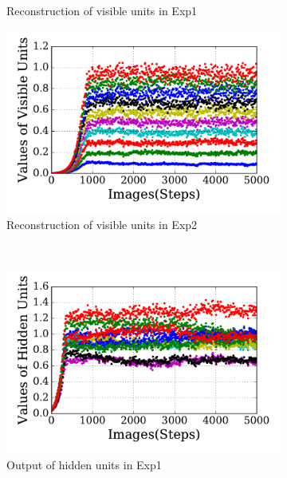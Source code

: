 \begin{figure}
\begin{subfigure}[t]{0.45\textwidth}
		\caption{Reconstruction of visible units in Exp1}
	\end{subfigure}
	\begin{subfigure}[t]{0.45\textwidth}
		\includegraphics[width=\textwidth]{pics_sdlm/31_exp_RBM_noise/exp2_recon_s.pdf}
		\caption{Reconstruction of visible units in Exp2}
	\end{subfigure}\\
	\begin{subfigure}[t]{0.45\textwidth}
		\includegraphics[width=\textwidth]{pics_sdlm/31_exp_RBM_noise/exp1_hid_s.pdf}
		\caption{Output of hidden units in Exp1}
	\end{subfigure}
	\begin{subfigure}[t]{0.45\textwidth}

\end{subfigure}
\end{figure}
